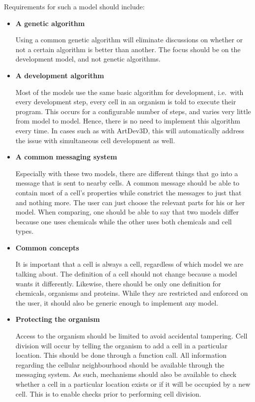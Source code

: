 Requirements for such a model should include:
\begin{itemize}
	\item\textbf{A genetic algorithm}

	Using a common genetic algorithm will eliminate discussions on whether or not a certain algorithm is better than another. The focus should be on the development model, and not genetic algorithms.

	\item\textbf{A development algorithm}

	Most of the models use the same basic algorithm for development, i.e.\ with every development step, every cell in an organism is told to execute their program. This occurs for a configurable number of steps, and varies very little from model to model. Hence, there is no need to implement this algorithm every time. In cases such as with ArtDev3D, this will automatically address the issue with simultaneous cell development as well.

	\item\textbf{A common messaging system}

	Especially with these two models, there are different things that go into a message that is sent to nearby cells. A common message should be able to contain most of a cell's properties while constrict the messages to just that and nothing more. The user can just choose the relevant parts for his or her model. When comparing, one should be able to say that two models differ because one uses chemicals while the other uses both chemicals and cell types.

	\item\textbf{Common concepts}

	It is important that a cell is always a cell, regardless of which model we are talking about. The definition of a cell should not change because a model wants it differently. Likewise, there should be only one definition for chemicals, organisms and proteins. While they are restricted and enforced on the user, it should also be generic enough to implement any model.

	\item\textbf{Protecting the organism}

	Access to the organism should be limited to avoid accidental tampering. Cell division will occur by telling the organism to add a cell in a particular location. This should be done through a function call. All information regarding the cellular neighbourhood should be available through the messaging system. As such, mechanisms should also be available to check whether a cell in a particular location exists or if it will be occupied by a new cell. This is to enable checks prior to performing cell division.
\end{itemize}

